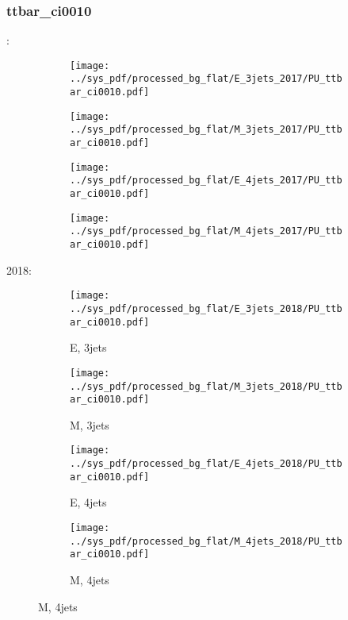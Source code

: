 \documentclass{beamer}
\begin{document}
\begin{frame}
\frametitle{ttbar_ci0010}
\fontsize{5}{1}:
\begin{figure}
\centering
\begin{subfigure}[b]{0.24\textwidth}
\texttt{[image: ../sys\_pdf/processed\_bg\_flat/E\_3jets\_2017/PU\_ttbar\_ci0010.pdf]}
\end{subfigure}
\begin{subfigure}[b]{0.24\textwidth}
\texttt{[image: ../sys\_pdf/processed\_bg\_flat/M\_3jets\_2017/PU\_ttbar\_ci0010.pdf]}
\end{subfigure}
\begin{subfigure}[b]{0.24\textwidth}
\texttt{[image: ../sys\_pdf/processed\_bg\_flat/E\_4jets\_2017/PU\_ttbar\_ci0010.pdf]}
\end{subfigure}
\begin{subfigure}[b]{0.24\textwidth}
\texttt{[image: ../sys\_pdf/processed\_bg\_flat/M\_4jets\_2017/PU\_ttbar\_ci0010.pdf]}
\end{subfigure}
\end{figure}
2018:
\begin{figure}
\centering
\begin{subfigure}[b]{0.24\textwidth}
\texttt{[image: ../sys\_pdf/processed\_bg\_flat/E\_3jets\_2018/PU\_ttbar\_ci0010.pdf]}
\captionsetup{font=tiny}
\caption{E, 3jets}
\end{subfigure}
\begin{subfigure}[b]{0.24\textwidth}
\texttt{[image: ../sys\_pdf/processed\_bg\_flat/M\_3jets\_2018/PU\_ttbar\_ci0010.pdf]}
\captionsetup{font=tiny}
\caption{M, 3jets}
\end{subfigure}
\begin{subfigure}[b]{0.24\textwidth}
\texttt{[image: ../sys\_pdf/processed\_bg\_flat/E\_4jets\_2018/PU\_ttbar\_ci0010.pdf]}
\captionsetup{font=tiny}
\caption{E, 4jets}
\end{subfigure}
\begin{subfigure}[b]{0.24\textwidth}
\texttt{[image: ../sys\_pdf/processed\_bg\_flat/M\_4jets\_2018/PU\_ttbar\_ci0010.pdf]}
\captionsetup{font=tiny}
\caption{M, 4jets}
\end{subfigure}
\end{figure}
\end{frame}
\end{document}
